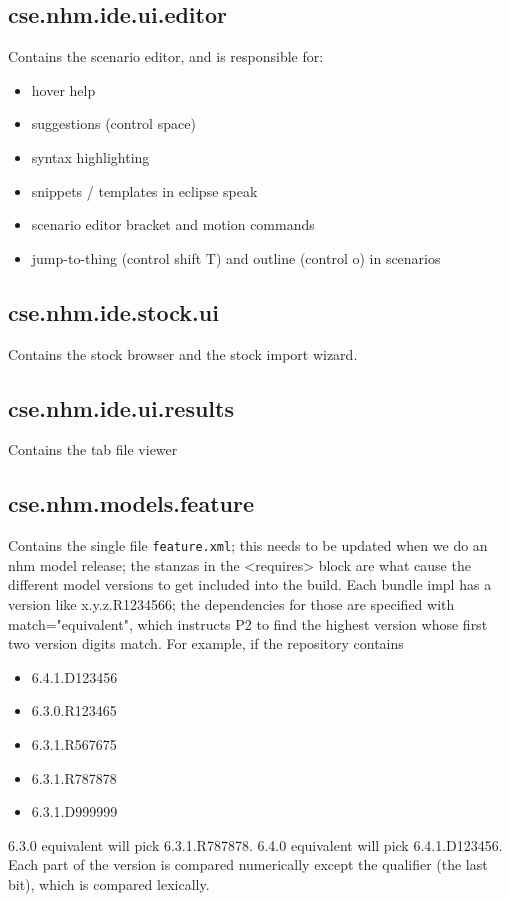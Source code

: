 \documentclass[11pt]{article}
\begin{document}
\subsection{cse.nhm.ide.ui.editor}
\label{sec-1-6}
Contains the scenario editor, and is responsible for:

\begin{itemize}
\item hover help
\item suggestions (control space)
\item syntax highlighting
\item snippets / templates in eclipse speak
\item scenario editor bracket and motion commands
\item jump-to-thing (control shift T) and outline (control o) in scenarios
\end{itemize}
\subsection{cse.nhm.ide.stock.ui}
\label{sec-1-7}
Contains the stock browser and the stock import wizard.
\subsection{cse.nhm.ide.ui.results}
\label{sec-1-8}
Contains the tab file viewer
\subsection{cse.nhm.models.feature}
\label{sec-1-9}
Contains the single file \texttt{feature.xml}; this needs to be updated when we do an nhm model release; the stanzas in the <requires> block are what cause the different model versions to get included into the build. Each bundle impl has a version like x.y.z.R1234566; the dependencies for those are specified with match="equivalent", which instructs P2 to find the highest version whose first two version digits match. For example, if the repository contains

\begin{itemize}
\item 6.4.1.D123456
\item 6.3.0.R123465
\item 6.3.1.R567675
\item 6.3.1.R787878
\item 6.3.1.D999999
\end{itemize}

6.3.0 equivalent will pick 6.3.1.R787878. 6.4.0 equivalent will pick 6.4.1.D123456. Each part of the version is compared numerically except the qualifier (the last bit), which is compared lexically.
\end{document}
